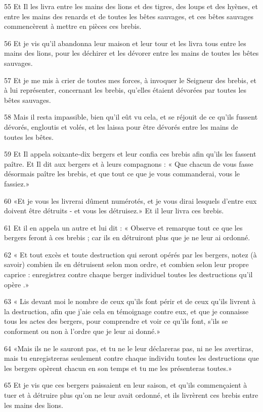 \par 55 Et Il les livra entre les mains des lions et des tigres, des loups et des hyènes, et entre les mains des renards et de toutes les bêtes sauvages, et ces bêtes sauvages commencèrent à mettre en pièces ces brebis.
\par 56 Et je vis qu'il abandonna leur maison et leur tour et les livra tous entre les mains des lions, pour les déchirer et les dévorer entre les mains de toutes les bêtes sauvages.
\par 57 Et je me mis à crier de toutes mes forces, à invoquer le Seigneur des brebis, et à lui représenter, concernant les brebis, qu'elles étaient dévorées par toutes les bêtes sauvages.
\par 58 Mais il resta impassible, bien qu'il eût vu cela, et se réjouit de ce qu'ils fussent dévorés, engloutis et volés, et les laissa pour être dévorés entre les mains de toutes les bêtes.
\par 59 Et Il appela soixante-dix bergers et leur confia ces brebis afin qu'ils les fassent paître. Et Il dit aux bergers et à leurs compagnons : « Que chacun de vous fasse désormais paître les brebis, et que tout ce que je vous commanderai, vous le fassiez.»
\par 60 «Et je vous les livrerai dûment numérotés, et je vous dirai lesquels d'entre eux doivent être détruits - et vous les détruisez.» Et il leur livra ces brebis.
\par 61 Et il en appela un autre et lui dit : « Observe et remarque tout ce que les bergers feront à ces brebis ; car ils en détruiront plus que je ne leur ai ordonné.
\par 62 « Et tout excès et toute destruction qui seront opérés par les bergers, notez (à savoir) combien ils en détruisent selon mon ordre, et combien selon leur propre caprice : enregistrez contre chaque berger individuel toutes les destructions qu'il opère .»
\par 63 « Lis devant moi le nombre de ceux qu'ils font périr et de ceux qu'ils livrent à la destruction, afin que j'aie cela en témoignage contre eux, et que je connaisse tous les actes des bergers, pour comprendre et voir ce qu'ils font, s'ils se conforment ou non à l'ordre que je leur ai donné.»
\par 64 «Mais ils ne le sauront pas, et tu ne le leur déclareras pas, ni ne les avertiras, mais tu enregistreras seulement contre chaque individu toutes les destructions que les bergers opèrent chacun en son temps et tu me les présenteras toutes.»
\par 65 Et je vis que ces bergers paissaient en leur saison, et qu'ils commençaient à tuer et à détruire plus qu'on ne leur avait ordonné, et ils livrèrent ces brebis entre les mains des lions.
